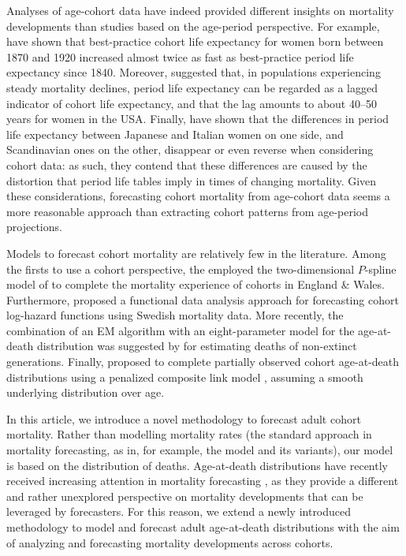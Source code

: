 \documentclass[11pt, a4paper]{article}
\begin{document}

{\color{red}Analyses of age-cohort data have indeed provided different insights on mortality developments than studies based on the age-period perspective. For example, \cite{shkolnikov2011steep} have shown that best-practice cohort life expectancy for women born between 1870 and 1920 increased almost twice as fast as best-practice period life expectancy since 1840. Moreover, \cite{goldstein2006relationships} suggested that, in populations experiencing steady mortality declines, period life expectancy can be regarded as a lagged indicator of cohort life expectancy, and that the lag amounts to about 40--50 years for women in the USA. Finally, \cite{borgan2019cohort} have shown that the differences in period life expectancy between Japanese and Italian women on one side, and Scandinavian ones on the other, disappear or even reverse when considering cohort data: as such, they contend that these differences are caused by the distortion that period life tables imply in times of changing mortality. Given these considerations, forecasting cohort mortality from age-cohort data seems a more reasonable approach than extracting cohort patterns from age-period projections. \par}

Models to forecast cohort mortality are relatively few in the literature. Among the firsts to use a cohort perspective, the \cite{cmi2007stochastic} employed the two-dimensional $P$-spline model of \cite{currie2004smoothing} to complete the mortality experience of cohorts in England \& Wales. Furthermore, \cite{chiou2009modeling} proposed a functional data analysis approach for forecasting cohort log-hazard functions using Swedish mortality data. More recently, the combination of an EM algorithm with an eight-parameter model for the age-at-death distribution was suggested by \cite{zanotto2017reconstruction} for estimating 
deaths of non-extinct generations. Finally, \cite{rizzi2019forecasting} proposed to complete partially observed cohort age-at-death distributions using a penalized composite link model \citep{eilers2007ill}, assuming a smooth underlying distribution over age. 

In this article, we introduce a novel methodology to forecast adult cohort mortality. Rather than modelling mortality rates (the standard approach in mortality forecasting, as in, for example, the \citeauthor{lee1992modeling} model and its variants), our model is based on the distribution of deaths. Age-at-death distributions have recently received increasing attention in mortality forecasting \citep{oeppen2008coherent,bergeron2017coherent,basellini2019three,basellini2019modelling,pascariu2019maximum}, as they provide a different and rather unexplored perspective on mortality developments that can be leveraged by forecasters. For this reason, we extend a newly introduced methodology to model and forecast adult age-at-death distributions \citep{basellini2019modelling} with the aim of analyzing and forecasting mortality developments across cohorts. 
 
\end{document}
